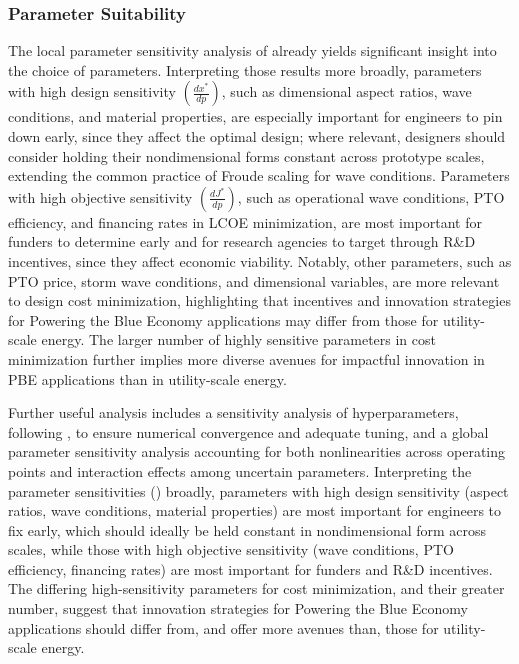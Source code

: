 \subsubsection{Parameter Suitability}
\ifdefined\DISSERTATION
    The local parameter sensitivity analysis of  already yields significant insight into the choice of parameters.
    Interpreting those results more broadly, parameters with high design sensitivity $\left(\frac{dx^*}{dp}\right)$, such as dimensional aspect ratios, wave conditions, and material properties, are especially important for engineers to pin down early, since they affect the optimal design; where relevant, designers should consider holding their nondimensional forms constant across prototype scales, extending the common practice of Froude scaling for wave conditions.
    Parameters with high objective sensitivity $\left(\frac{dJ^*}{dp}\right)$, such as operational wave conditions, PTO efficiency, and financing rates in LCOE minimization, are most important for funders to determine early and for research agencies to target through R\&D incentives, since they affect economic viability.
    Notably, other parameters, such as PTO price, storm wave conditions, and dimensional variables, are more relevant to design cost minimization, highlighting that incentives and innovation strategies for Powering the Blue Economy applications may differ from those for utility-scale energy.
    The larger number of highly sensitive parameters in cost minimization further implies more diverse avenues for impactful innovation in PBE applications than in utility-scale energy.
    
    Further useful analysis includes a sensitivity analysis of hyperparameters, following , to ensure numerical convergence and adequate tuning, and a global parameter sensitivity analysis accounting for both nonlinearities across operating points and interaction effects among uncertain parameters.
\else
    Interpreting the parameter sensitivities () broadly, parameters with high design sensitivity (aspect ratios, wave conditions, material properties) are most important for engineers to fix early,
    which should ideally be held constant in nondimensional form across scales,
    while those with high objective sensitivity (wave conditions, PTO efficiency, financing rates) are most important for funders and R\&D incentives.
    The differing high-sensitivity parameters for cost minimization, and their greater number, suggest that 
    innovation strategies for Powering the Blue Economy applications should differ from, and offer more avenues than, those for utility-scale energy.
\fi

